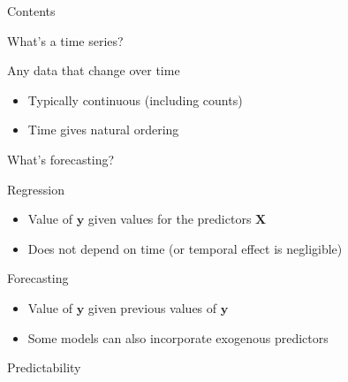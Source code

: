 \documentclass[12pt,aspectratio=169]{beamer}
\renewcommand{\vec}[1]{\ensuremath{\mathbf{#1}}}
\newcommand{\mat}[1]{\ensuremath{\vec{#1}}}
\begin{document}
\begin{frame}{Contents}
    \tableofcontents[hideallsubsections]
\end{frame}

\begin{frame}{What's a time series?}
    \begin{center}
        \Large%
        Any data that change \alert{over time}
    \end{center}
    \vfill
    \begin{itemize}
        \item Typically continuous (including counts)
        \item Time gives natural ordering
    \end{itemize}
\end{frame}

\begin{frame}{What's forecasting?}
    \begin{block}{Regression}
        \begin{itemize}
            \item Value of $\vec{y}$ given values for the predictors $\mat{X}$
            \item Does not depend on time (or temporal effect is negligible)
        \end{itemize}
    \end{block}
    \vfill\pause
    \begin{block}{Forecasting}
        \begin{itemize}
            \item Value of $\vec{y}$ given \alert{previous values} of $\vec{y}$
            \item Some models can also incorporate exogenous predictors
        \end{itemize}
    \end{block}
\end{frame}

\begin{frame}{Predictability}
\end{frame}
\end{document}
